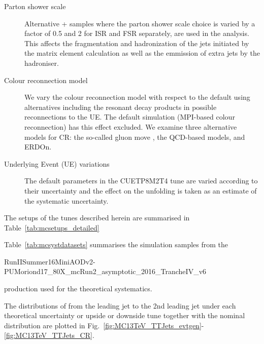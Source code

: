 \begin{description}
\begin{description}
  \item[Parton shower scale] Alternative \POWHEG +  samples where the parton shower scale choice is varied by a factor of 0.5 and 2 for ISR and FSR separately, are used in the analysis. This affects the fragmentation and hadronization of the jets initiated by the matrix element calculation as well as the emmission of extra jets by the hadroniser.

  \item[Colour reconnection model] We vary the colour reconnection model with respect to the default using alternatives including the resonant decay products in possible reconnections to the UE. The default simulation (MPI-based colour reconnection) has this effect excluded. We examine three alternative models for CR: the so-called gluon move \cite{Argyropoulos:2014zoa}, the QCD-based models\cite{Christiansen:2015yqa}, and ERDOn. 

  \item[Underlying Event (UE) variations] The default parameters in the CUETP8M2T4 tune are varied according to their uncertainty and the effect on the unfolding is taken as an estimate of the systematic uncertainty.
  \end{description}
  The setups of the \PYTHIA tunes described herein are summarised in Table~\ref{tab:mcsetups_detailed}
\end{description}

Table~\ref{tab:mcsystdatasets} summarises the simulation samples from the

RunIISummer16MiniAODv2-PUMoriond17\_80X\_mcRun2\_asymptotic\_2016\_TrancheIV\_v6

production used for the theoretical systematics.

The distributions of \pullangle from the leading jet \leadingjet to the 2nd leading jet \scndleadingjet under each theoretical uncertainty or upside or downside \PYTHIA tune together with the nominal distribution are plotted in Fig.~\ref{fig:MC13TeV_TTJets_evtgen}-\ref{fig:MC13TeV_TTJets_CR}.



